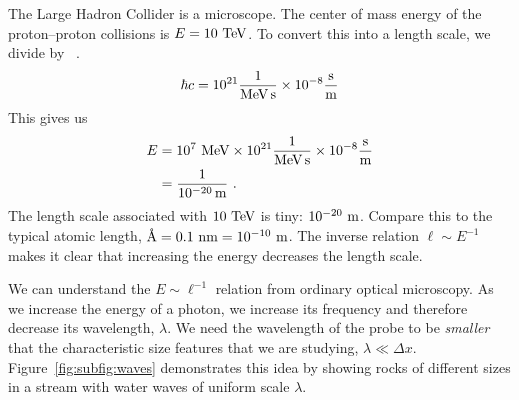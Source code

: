 \documentclass[12pt, oneside]{report}    %
\begin{document}
\begin{example}
The Large Hadron Collider is a microscope. The center of mass energy of the proton--proton collisions is $E = 10~\textnormal{TeV}$. To convert this into a length scale, we divide by \ .
\begin{align}
    \hbar c = 10^{21}\frac{1}{\textnormal{MeV}\,\textnormal{s}} \times 10^{-8} \frac{\textnormal{s}}{\textnormal{m}}
\end{align}
This gives us
\begin{align}
    E &= 10^7~\textnormal{MeV} \times 10^{21}\frac{1}{\textnormal{MeV}\,\textnormal{s}} \times 10^{-8} \frac{\textnormal{s}}{\textnormal{m}}
    \\
    &= \frac{1}{10^{-20}\,\textnormal{m}} \ .
\end{align}
The length scale associated with $10~\textnormal{TeV}$ is tiny: $10^{-20}~\textnormal{m}$. Compare this to the typical atomic length, $\text{\AA} = 0.1~\textnormal{nm} = 10^{-10}~\textnormal{m}$. The inverse relation $\ell \sim E^{-1}$ makes it clear that increasing the energy decreases the length scale. 
\end{example}

We can understand the $E \sim \ell^{-1}$ relation from ordinary optical microscopy. As we increase the energy of a photon, we increase its frequency and therefore decrease its wavelength, $\lambda$. We need the wavelength of the probe to be \emph{smaller} that the characteristic size features that we are studying, $\lambda \ll \Delta x$. Figure~\ref{fig:subfig:waves} demonstrates this idea by showing rocks of different sizes in a stream with water waves of uniform scale $\lambda$.
\end{document}
